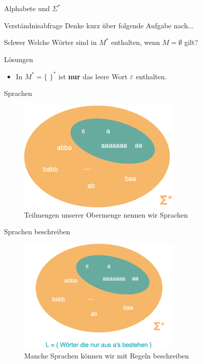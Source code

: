 \begin{frame}[fragile]{Alphabete und $\Sigma^{*}$}
\begin{alertblock}{Verständnisabfrage}
    Denke kurz über folgende Aufgabe nach...
    \end{alertblock}
    
    \begin{block}{Schwer}
        Welche Wörter sind in $M^{*}$ enthalten, wenn $M = \emptyset$ gilt?
    \end{block}
\end{frame}

{
\begin{frame}{Lösungen}
  \begin{itemize}
        \item In $M^{*} = \{$ $ \}^{*}$ ist \textbf{nur} das leere Wort $\varepsilon$ enthalten.
    \end{itemize}
\end{frame}
}

\begin{frame}[fragile]{Sprachen}
\begin{figure}
    \centering
    \includegraphics[width=0.7\textwidth]{figures/MysterySprache.png}
    \caption{Teilmengen unserer Obermenge nennen wir Sprachen}
    \label{fig:my_label}
\end{figure}
\end{frame}

\begin{frame}[fragile]{Sprachen beschreiben}
\begin{figure}
    \centering
    \includegraphics[width=0.7\textwidth]{figures/SprachReveal.png}
    \caption{Manche Sprachen können wir mit Regeln beschreiben}
    \label{fig:my_label}
\end{figure}
\end{frame}

